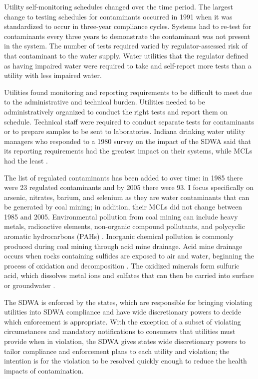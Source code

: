 \documentclass{article}
\begin{document}
Utility self-monitoring schedules changed over the time period. The largest change to testing schedules for contaminants occurred in 1991 when it was standardized to occur in three-year compliance cycles. Systems had to re-test for contaminants every three years to demonstrate the contaminant was not present in the system. The number of tests required varied by regulator-assessed risk of that contaminant to the water supply. Water utilities that the regulator defined as having impaired water were required to take and self-report more tests than a utility with less impaired water. 

Utilities found monitoring and reporting requirements to be difficult to meet due to the administrative and technical burden. Utilities needed to be administratively organized to conduct the right tests and report them on schedule. Technical staff were required to conduct separate tests for contaminants or to prepare samples to be sent to laboratories. Indiana drinking water utility managers who responded to a 1980 survey on the impact of the SDWA said that its reporting requirements had the greatest impact on their systems, while MCLs had the least \parencite{oleckno1982national}.

The list of regulated contaminants has been added to over time: in 1985 there were 23 regulated contaminants and by 2005 there were 93. I focus specifically on arsenic, nitrates, barium, and selenium as they are water contaminants that can be generated by coal mining; in addition, their MCLs did not change between 1985 and 2005. Environmental pollution from coal mining can include heavy metals, radioactive elements, non-organic compound pollutants, and polycyclic aromatic hydrocarbons (PAHs) \parencite{rouhani2023overview,boente2020benzo,liang2017spatial}. Inorganic chemical pollution is commonly produced during coal mining through acid mine drainage. Acid mine drainage occurs when rocks containing sulfides are exposed to air and water, beginning the process of oxidation and decomposition \parencite{ceto2000abandoned}. The oxidized minerals form sulfuric acid, which dissolves metal ions and sulfates that can then be carried into surface or groundwater \parencite{akcil2006acid,skousen2019acid}.

The SDWA is enforced by the states, which are responsible for bringing violating utilities into SDWA compliance and have wide discretionary powers to decide which enforcement is appropriate. With the exception of a subset of violating circumstances and mandatory notifications to consumers that utilities must provide when in violation, the SDWA gives states wide discretionary powers to tailor compliance and enforcement plans to each utility and violation; the intention is for the violation to be resolved quickly enough to reduce the health impacts of contamination.
\end{document}
